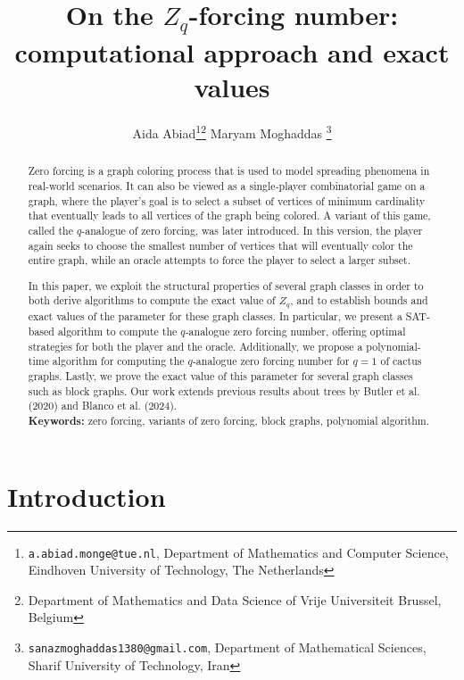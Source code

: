 \documentclass[11pt]{article}
\title{On the $Z_q$-forcing number:\\ computational approach and exact values}
\author{Aida Abiad\thanks{\texttt{a.abiad.monge@tue.nl},  Department of Mathematics and Computer Science, Eindhoven University of Technology, The Netherlands}\thanks{Department of Mathematics and Data Science of Vrije Universiteit Brussel, Belgium}
\qquad Maryam Moghaddas \thanks{\texttt{sanazmoghaddas1380@gmail.com}, 
Department of Mathematical Sciences, Sharif University of Technology, Iran}
}
\date{}
\theoremstyle{plain}
\theoremstyle{definition}
\theoremstyle{remark}
\begin{document}
\maketitle


\begin{abstract}
Zero forcing is a graph coloring process that is used to model spreading phenomena in real-world scenarios. It can also be viewed as a single-player combinatorial game on a graph, where the player's goal is to select a subset of vertices of minimum cardinality that eventually leads to all vertices of the graph being colored. A variant of this game, called the $q$-analogue of zero forcing, was later introduced. In this version, the player again seeks to choose the smallest number of vertices that will eventually color the entire graph, while an oracle attempts to force the player to select a larger subset.

In this paper, we exploit the structural properties of several graph classes in order to both derive algorithms to compute the exact value of $Z_q$, and to establish bounds and exact values of the parameter for these graph classes. In particular, we present a SAT-based algorithm to compute the $q$-analogue zero forcing number, offering optimal strategies for both the player and the oracle. Additionally, we propose a polynomial-time algorithm for computing the $q$-analogue zero forcing number for $q=1$ of cactus graphs. Lastly, we prove the exact value of this parameter for several graph classes such as block graphs. Our work extends previous results about trees by Butler et al. (2020) and Blanco et al. (2024).\\

\noindent\textbf{Keywords:} zero forcing, variants of zero forcing, block graphs, polynomial algorithm.
\end{abstract}

\section{Introduction}
\end{document}
